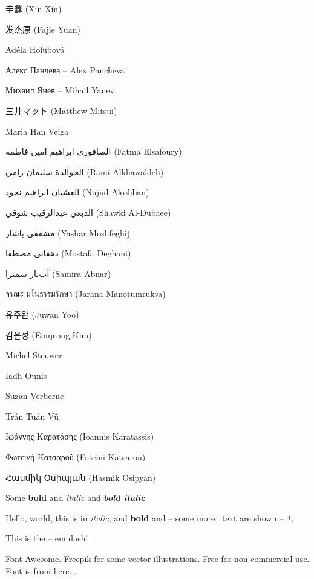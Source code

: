 \begin{preamble}
{\asianfont 辛鑫} (Xin Xin)

{\asianfont 发杰原} (Fajie Yuan)

Ad\'{e}la Holubov\'{a}

Алекс Панчева -- Alex Pancheva

Михаил Янев -- Mihail Yanev

{\asianfont 三井マット} (Matthew Mitsui)

Maria Han Veiga

{\arabicfont الصافوري ابراهيم امين فاطمه} (Fatma Elsafoury)

{\arabicfont  الخوالدة سليمان رامي} (Rami Alkhawaldeh)

{\arabicfont العشبان ابراهيم نجود} (Nujud Aloshban)

{\arabicfont الدبعي عبدالرقيب شوقي} (Shawki Al-Dubaee)

{\farsifont مشفقى ياشار} (Yashar Moshfeghi)

{\farsifont دهقانی مصطفا} (Mostafa Deghani)

{\farsifont آب‌نار سمیرا} (Samira Abnar)

{\thaifont \Large จรณะ มโนธรรมรักษา} (Jarana Manotumruksa)

{\asianfont 유주완} (Juwan Yoo)

{\asianfont 김은정} (Eunjeong Kim)

Michel Steuwer

Iadh Ounis

Suzan Verberne


Trần Tuấn Vũ

Ιωάννης Καρατάσης (Ioannis Karatassis)

Φωτεινή Κατσαρού (Foteini Katsarou)

{\armenianfont Հասմիկ Օսիպյան} (Hasmik Osipyan)

Some \textbf{bold} and \emph{italic} and \textbf{\emph{bold italic}}

{\metafont Hello, world, this is in \emph{italic}, and \textbf{bold} and -- some more \textemdash~text are shown – \emph{1,}}

This is the -- em \textemdash dash!



\todo{========}
 
Font Awesome. Freepik for some vector illustrations. Free for non-commercial use. Font is from here...


\end{preamble}
